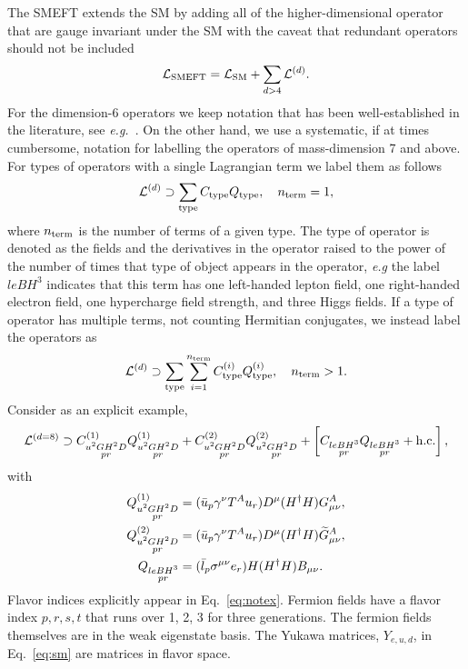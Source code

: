 The SMEFT extends the SM by adding all of the higher-dimensional operator that are gauge invariant under the SM with the caveat that redundant operators should not be included
\begin{equation}
\mathcal L_{\rm SMEFT} = \mathcal L_{\rm SM} + \sum_{d > 4} \mathcal{L}^{(d)} .
\end{equation}
For the dimension-6 operators we keep notation that has been well-established in the literature, see \textit{e.g.}~\cite{Alonso:2013hga}.
On the other hand, we use a systematic, if at times cumbersome, notation for labelling the operators of mass-dimension 7 and above.
For types of operators with a single Lagrangian term we label them as follows
\begin{equation}
\mathcal{L}^{(d)} \supset \sum_{\rm type} C_{\rm type} Q_{\rm type} , \quad n_{\rm term} = 1,
\end{equation}
where $n_{\rm term}$ is the number of terms of a given type.
The type of operator is denoted as the fields and the derivatives in the operator raised to the power of the number of times that type of object appears in the operator, \textit{e.g} the label $leBH^3$ indicates that this term has one left-handed lepton field, one right-handed electron field, one hypercharge field strength, and three Higgs fields.
If a type of operator has multiple terms, not counting Hermitian conjugates, we instead label the operators as
\begin{equation}
\mathcal{L}^{(d)} \supset \sum_{\rm type} \sum_{i = 1}^{n_{\rm term}} C_{\rm type}^{(i)} Q_{\rm type}^{(i)} , \quad n_{\rm term} > 1 .
\end{equation}
Consider as an explicit example,
\begin{equation}
\label{eq:notex}
\mathcal{L}^{(d=8)} \supset C_{\substack{u^2GH^2D \\ pr}}^{(1)} Q_{\substack{u^2GH^2D \\ pr}}^{(1)} + C_{\substack{u^2GH^2D \\ pr}}^{(2)} Q_{\substack{u^2GH^2D\\ pr}}^{(2)} + \left[C_{\substack{leBH^3 \\ pr}} Q_{\substack{leBH^3 \\ pr}} + \mathrm{h.c.}\right] ,
\end{equation}
with
\begin{align}
Q_{\substack{u^2GH^2D \\ pr}}^{(1)} &= (\bar u_p \gamma^\nu T^A u_r) D^\mu (H^\dag H) G^A_{\mu\nu} , \nonumber\\ 
Q_{\substack{u^2GH^2D\\ pr}}^{(2)} &= (\bar u_p \gamma^\nu T^A u_r) D^\mu (H^\dag H) \widetilde G^A_{\mu\nu} , \nonumber\\ 
Q_{\substack{leBH^3 \\ pr}} &= (\bar l_p \sigma^{\mu\nu} e_r) H (H^\dag H) B_{\mu\nu} .
\end{align}
Flavor indices explicitly appear in Eq.~\eqref{eq:notex}.
Fermion fields have a flavor index $p, r, s, t$ that runs over 1, 2, 3 for three generations.
The fermion fields themselves are in the weak eigenstate basis.
The Yukawa matrices, $Y_{e, u, d}$, in Eq.~\eqref{eq:sm} are matrices in flavor space.

